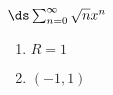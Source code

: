 {$\ds\sum_{n=0}^\infty \sqrt{n}x^{n}$
}
{\begin{enumerate}
	\item $R=1$
	\item	$(-1,1)$
\end{enumerate}
}